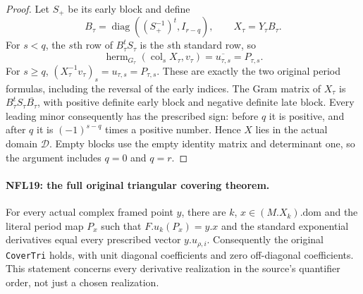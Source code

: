 \begin{proof}
Let $S_+$ be its early block and define
\[
 B_\tau=\operatorname{diag}((S_+^{-1})^t,I_{r-q}),
 \qquad X_\tau=Y_\tau B_\tau.
 \tag{NFL.26}
\]
For $s<q$, the $s$th row of $B_\tau^tS_\tau$ is the $s$th
standard row, so
\[
 \operatorname{herm}_{G_\tau}(\operatorname{col}_sX_\tau,v_\tau)
      =\overline{u_{\tau,s}}=P_{\tau,s}.
\]
For $s\ge q$, $(X_\tau^{-1}v_\tau)_s=u_{\tau,s}=P_{\tau,s}$.
These are exactly the two original period formulas, including
the reversal of the early indices.  The Gram matrix of $X_\tau$
is $B_\tau^tS_\tau\overline{B_\tau}$, with positive definite
early block and negative definite late block.  Every leading
minor consequently has the prescribed sign: before $q$ it
is positive, and after $q$ it is $(-1)^{s-q}$ times a positive
number.  Hence $X$ lies in the actual domain $\mathcal D$.
Empty blocks use the empty identity matrix and determinant one,
so the argument includes $q=0$ and $q=r$.
\end{proof}

\paragraph{NFL19: the full original triangular covering theorem.}
\label{claim:NFL19}
For every actual complex framed point $y$, there are $k$,
$x\in(M.X_k).\mathrm{dom}$ and the literal period map $P_x$
such that $F.u_k(P_x)=y.x$ and the standard exponential
derivatives equal every prescribed vector $y.u_{\rho,i}$.
Consequently the original \texttt{CoverTri} holds, with unit
diagonal coefficients and zero off-diagonal coefficients.
This statement concerns every derivative realization in the
source's quantifier order, not just a chosen realization.


